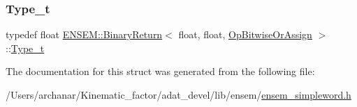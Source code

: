 \mbox{\label{structENSEM_1_1BinaryReturn_3_01float_00_01float_00_01OpBitwiseOrAssign_01_4_a3e0892dc0a6beaa65d6fbf03b5fe3250}} 
\subsubsection{\texorpdfstring{Type\_t}{Type\_t}\hspace{0.1cm}{\footnotesize\ttfamily [2/2]}}
{\footnotesize\ttfamily typedef float \mbox{\hyperlink{structENSEM_1_1BinaryReturn}{E\+N\+S\+E\+M\+::\+Binary\+Return}}$<$ float, float, \mbox{\hyperlink{structENSEM_1_1OpBitwiseOrAssign}{Op\+Bitwise\+Or\+Assign}} $>$\+::\mbox{\hyperlink{structENSEM_1_1BinaryReturn_3_01float_00_01float_00_01OpBitwiseOrAssign_01_4_a3e0892dc0a6beaa65d6fbf03b5fe3250}{Type\+\_\+t}}}



The documentation for this struct was generated from the following file\+:\begin{DoxyCompactItemize}
\item 
/\+Users/archanar/\+Kinematic\+\_\+factor/adat\+\_\+devel/lib/ensem/\mbox{\hyperlink{lib_2ensem_2ensem__simpleword_8h}{ensem\+\_\+simpleword.\+h}}\end{DoxyCompactItemize}
